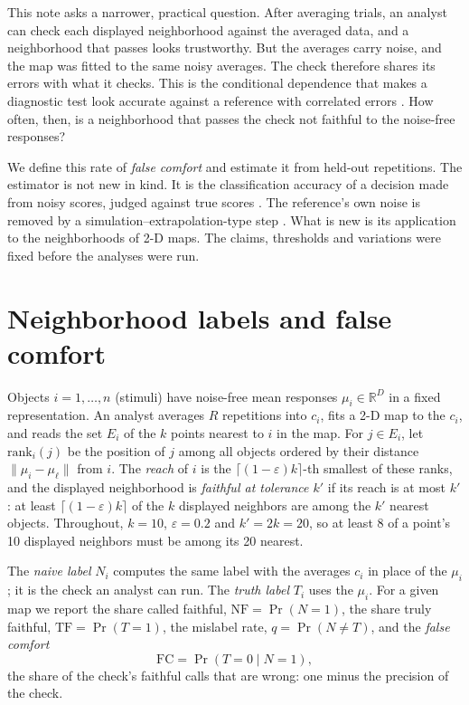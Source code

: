 \documentclass[11pt]{article}
\begin{document}
This note asks a narrower, practical question. After averaging trials, an analyst can check
each displayed neighborhood against the averaged data, and a neighborhood that passes looks
trustworthy. But the averages carry noise, and the map was fitted to the same noisy averages.
The check therefore shares its errors with what it checks. This is the conditional dependence
that makes a diagnostic test look accurate against a reference with correlated errors
\citep{vacek1985}. How often, then, is a neighborhood that passes the check not faithful to the
noise-free responses?

We define this rate of \emph{false comfort} and estimate it from held-out repetitions. The
estimator is not new in kind. It is the classification accuracy of a decision made from noisy
scores, judged against true scores \citep{livingston1995}. The reference's own noise is removed
by a simulation--extrapolation-type step \citep{cook1994,devanarayan2002}. What is new is its
application to the neighborhoods of 2-D maps. The claims, thresholds and variations were fixed
before the analyses were run.

\section{Neighborhood labels and false comfort}\label{sec:def}

Objects $i=1,\dots,n$ (stimuli) have noise-free mean responses $\mu_i\in\mathbb{R}^D$ in a fixed
representation. An analyst averages $R$ repetitions into $c_i$, fits a 2-D map to the $c_i$, and
reads the set $E_i$ of the $k$ points nearest to $i$ in the map. For $j\in E_i$, let
$\mathrm{rank}_i(j)$ be the position of $j$ among all objects ordered by their distance
$\|\mu_i-\mu_\ell\|$ from $i$. The \emph{reach} of $i$ is the $\lceil(1-\varepsilon)k\rceil$-th
smallest of these ranks, and the displayed neighborhood is \emph{faithful at tolerance $k'$} if
its reach is at most $k'$: at least $\lceil(1-\varepsilon)k\rceil$ of the $k$ displayed neighbors
are among the $k'$ nearest objects. Throughout, $k=10$, $\varepsilon=0.2$ and $k'=2k=20$, so at
least 8 of a point's 10 displayed neighbors must be among its 20 nearest.

The \emph{naive label} $N_i$ computes the same label with the averages $c_i$ in place of the
$\mu_i$; it is the check an analyst can run. The \emph{truth label} $T_i$ uses the $\mu_i$. For a
given map we report the share called faithful, $\mathrm{NF}=\Pr(N=1)$, the share truly
faithful, $\mathrm{TF}=\Pr(T=1)$, the mislabel rate, $q=\Pr(N\neq T)$, and the
\emph{false comfort}
\[
\mathrm{FC}=\Pr(T=0\mid N=1),
\]
the share of the check's faithful calls that are wrong: one minus the precision of the check.
\end{document}
